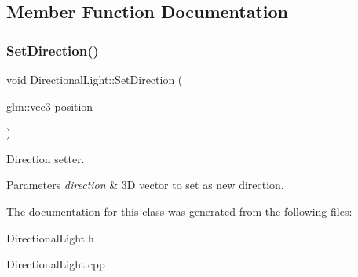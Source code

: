 \subsection{Member Function Documentation}
\mbox{\label{class_directional_light_afdd5ff26965bdc32a0254af59332afd5}} 
\subsubsection{\texorpdfstring{Set\+Direction()}{SetDirection()}}
{\footnotesize\ttfamily void Directional\+Light\+::\+Set\+Direction (\begin{DoxyParamCaption}\item[{glm\+::vec3}]{position }\end{DoxyParamCaption})}



Direction setter. 


\begin{DoxyParams}{Parameters}
{\em direction} & 3D vector to set as new direction. \\
\hline
\end{DoxyParams}


The documentation for this class was generated from the following files\+:\begin{DoxyCompactItemize}
\item 
Directional\+Light.\+h\item 
Directional\+Light.\+cpp\end{DoxyCompactItemize}
